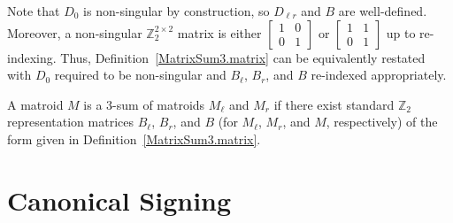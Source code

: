 \begin{definition}
    Note that $D_{0}$ is non-singular by construction, so $D_{\ell r}$ and $B$ are well-defined. Moreover, a non-singular $\mathbb{Z}_{2}^{2 \times 2}$ matrix is either  $\begin{bmatrix} 1 & 0 \\ 0 & 1 \end{bmatrix}$ or $\begin{bmatrix} 1 & 1 \\ 0 & 1 \end{bmatrix}$ up to re-indexing. Thus, Definition~\ref{MatrixSum3.matrix} can be equivalently restated with $D_{0}$ required to be non-singular and $B_{\ell}$, $B_{r}$, and $B$ re-indexed appropriately.
\end{definition}

\begin{definition}
    \label{Matroid.Is3sumOf}
    \leanok
    A matroid $M$ is a $3$-sum of matroids $M_{\ell}$ and $M_{r}$ if there exist standard $\mathbb{Z}_{2}$ representation matrices $B_{\ell}$, $B_{r}$, and $B$ (for $M_{\ell}$, $M_{r}$, and $M$, respectively) of the form given in Definition~\ref{MatrixSum3.matrix}.
\end{definition}


\section{Canonical Signing}

